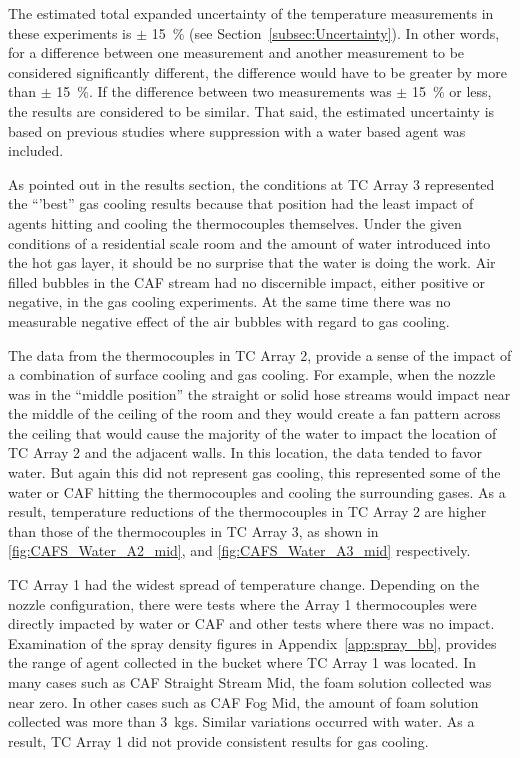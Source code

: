 \documentclass[12pt,oneside]{book}
\begin{document}
The estimated total expanded uncertainty of the temperature measurements in these experiments is $\pm$ 15~\% (see Section~\ref{subsec:Uncertainty}). In other words, for a difference between one measurement and another measurement to be considered significantly different, the difference would have to be greater by more than $\pm$ 15~\%. If the difference between two measurements was $\pm$ 15~\% or less, the results are considered to be similar. That said, the estimated uncertainty is based on previous studies where suppression with a water based agent was included.

As pointed out in the results section, the conditions at TC Array 3 represented the ``'best'' gas cooling results because that position had the least impact of agents hitting and cooling the thermocouples themselves. Under the given conditions of a residential scale room and the amount of water introduced into the hot gas layer, it should be no surprise that the water is doing the work. Air filled bubbles in the CAF stream had no discernible impact, either positive or negative, in the gas cooling experiments. At the same time there was no measurable negative effect of the air bubbles with regard to gas cooling.

The data from the thermocouples in TC Array 2, provide a sense of the impact of a combination of surface cooling and gas cooling. For example, when the nozzle was in the ``middle position'' the straight or solid hose streams would impact near the middle of the ceiling of the room and they would create a fan pattern across the ceiling that would cause the majority of the water to impact the location of TC Array 2 and the adjacent walls. In this location, the data tended to favor water. But again this did not represent gas cooling, this represented some of the water or CAF hitting the thermocouples and cooling the surrounding gases. As a result, temperature reductions of the thermocouples in TC Array 2 are higher than those of the thermocouples in TC Array 3, as shown in \ref{fig:CAFS_Water_A2_mid}, and \ref{fig:CAFS_Water_A3_mid} respectively.

TC Array 1 had the widest spread of temperature change. Depending on the nozzle configuration, there were tests where the Array 1 thermocouples were directly impacted by water or CAF and other tests where there was no impact. Examination of the spray density figures in Appendix~\ref{app:spray_bb}, provides the range of agent collected in the bucket where TC Array 1 was located. In many cases such as CAF Straight Stream Mid, the foam solution collected was near zero. In other cases such as CAF Fog Mid, the amount of foam solution collected was more than 3~kgs. Similar variations occurred with water. As a result, TC Array 1 did not provide consistent results for gas cooling.  
\end{document}
